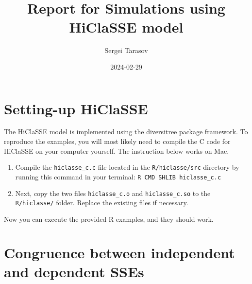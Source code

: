 \documentclass[
]{article}
\title{Report for Simulations using HiClaSSE model}
\author{Sergei Tarasov}
\date{2024-02-29}
\begin{document}
\maketitle

{
\setcounter{tocdepth}{2}
\tableofcontents
}
\hypertarget{setting-up-hiclasse}{%
\section{Setting-up HiClaSSE}\label{setting-up-hiclasse}}

The HiClaSSE model is implemented using the diversitree package framework. To reproduce the examples, you will most likely need to compile the C code for HiClaSSE on your computer yourself. The instruction below works on Mac.

\begin{enumerate}
\def\labelenumi{\arabic{enumi}.}
\item
  Compile the \texttt{hiclasse\_c.c} file located in the \texttt{R/hiclasse/src} directory by running this command in your terminal: \texttt{R\ CMD\ SHLIB\ hiclasse\_c.c}
\item
  Next, copy the two files \texttt{hiclasse\_c.o} and \texttt{hiclasse\_c.so} to the \texttt{R/hiclasse/} folder. Replace the existing files if necessary.
\end{enumerate}

Now you can execute the provided R examples, and they should work.

\hypertarget{congruence-between-independent-and-dependent-sses}{%
\section{Congruence between independent and dependent SSEs}\label{congruence-between-independent-and-dependent-sses}}
\end{document}
